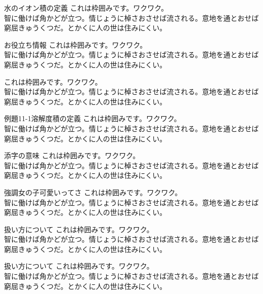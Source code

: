 \documentclass[book, twoside, paper=b5j, fleqn, jafontsize=9pt, jafontscale=0.91, head_space=22mm, foot_space=9mm, fore-edge=16mm, gutter=25mm, hanging_punctuation]{jlreq}
\begin{document}
\newpage
\begin{framebox-simple}{水のイオン積の定義}
これは枠囲みです。ワクワク。\\
智に働けば角かどが立つ。情じょうに棹さおさせば流される。意地を通とおせば窮屈きゅうくつだ。とかくに人の世は住みにくい。
\end{framebox-simple}

\begin{framebox-ref}{お役立ち情報}
これは枠囲みです。ワクワク。\\
智に働けば角かどが立つ。情じょうに棹さおさせば流される。意地を通とおせば窮屈きゅうくつだ。とかくに人の世は住みにくい。
\end{framebox-ref}

\begin{framebox-key}
これは枠囲みです。ワクワク。\\
智に働けば角かどが立つ。情じょうに棹さおさせば流される。意地を通とおせば窮屈きゅうくつだ。とかくに人の世は住みにくい。
\end{framebox-key}

\begin{framebox-simples}{例題11-1}{溶解度積の定義}
これは枠囲みです。ワクワク。\\
智に働けば角かどが立つ。情じょうに棹さおさせば流される。意地を通とおせば窮屈きゅうくつだ。とかくに人の世は住みにくい。
\end{framebox-simples}

\begin{framebox-note}{添字の意味}
これは枠囲みです。ワクワク。\\
智に働けば角かどが立つ。情じょうに棹さおさせば流される。意地を通とおせば窮屈きゅうくつだ。とかくに人の世は住みにくい。
\end{framebox-note}

\begin{framebox-ex}{強調}{女の子可愛いってさ}
これは枠囲みです。ワクワク。\\
智に働けば角かどが立つ。情じょうに棹さおさせば流される。意地を通とおせば窮屈きゅうくつだ。とかくに人の世は住みにくい。
\end{framebox-ex}

\begin{framebox-warning}{扱い方について}
これは枠囲みです。ワクワク。\\
智に働けば角かどが立つ。情じょうに棹さおさせば流される。意地を通とおせば窮屈きゅうくつだ。とかくに人の世は住みにくい。
\end{framebox-warning}
\extendpage
\begin{framebox-practice}{扱い方について}
    これは枠囲みです。ワクワク。\\
    智に働けば角かどが立つ。情じょうに棹さおさせば流される。意地を通とおせば窮屈きゅうくつだ。とかくに人の世は住みにくい。
    \end{framebox-practice}
\end{document}
